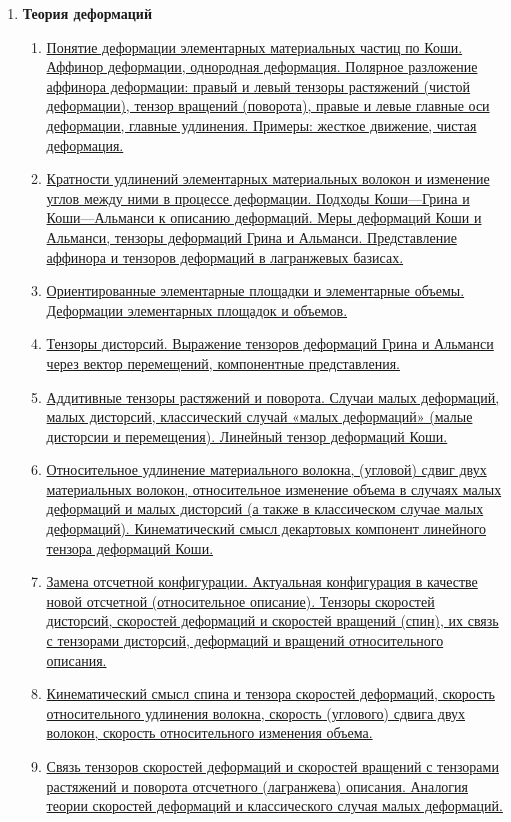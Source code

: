 \documentclass[a4paper,12pt]{article}
\begin{document}
\begin{enumerate}
\item \textbf{ Теория деформаций}
\begin{enumerate}
\item \hyperlink{bil3_1}{Понятие деформации элементарных материальных частиц по Коши. Аффинор деформации, однородная деформация. Полярное разложение аффинора деформации: правый и левый тензоры растяжений (чистой деформации), тензор вращений (поворота), правые и левые главные оси деформации, главные удлинения. Примеры: жесткое движение, чистая деформация.}
\item \hyperlink{bil3_2}{Кратности удлинений элементарных материальных волокон и изменение углов между ними в процессе деформации. Подходы Коши—Грина и Коши—Альманси к описанию деформаций. Меры деформаций Коши и Альманси, тензоры деформаций Грина и Альманси. Представление аффинора и тензоров деформаций в лагранжевых базисах.}
\item \hyperlink{bil3_3}{Ориентированные элементарные площадки и элементарные объемы. Деформации элементарных площадок и объемов.}
\item \hyperlink{bil3_4}{Тензоры дисторсий. Выражение тензоров деформаций Грина и Альманси через вектор перемещений, компонентные представления. }
\item \hyperlink{bil3_5}{Аддитивные тензоры растяжений и поворота. Случаи малых деформаций, малых дисторсий, классический случай «малых деформаций» (малые дисторсии и перемещения). Линейный тензор деформаций Коши. }
\item \hyperlink{bil3_6}{Относительное удлинение материального волокна, (угловой) сдвиг двух материальных волокон, относительное изменение объема в случаях малых деформаций и малых дисторсий (а также в классическом случае малых деформаций). Кинематический смысл декартовых компонент линейного тензора деформаций Коши.}
\item \hyperlink{bil3_7}{Замена отсчетной конфигурации. Актуальная конфигурация в качестве новой отсчетной (относительное описание). Тензоры скоростей дисторсий, скоростей деформаций и скоростей вращений (спин), их связь с тензорами дисторсий, деформаций и вращений относительного описания. }
\item \hyperlink{bil3_8}{Кинематический смысл спина и тензора скоростей деформаций, скорость относительного удлинения волокна, скорость (углового) сдвига двух волокон, скорость относительного изменения объема. }
\item \hyperlink{bil3_9}{ Связь тензоров скоростей деформаций и скоростей вращений с тензорами растяжений и поворота отсчетного (лагранжева) описания. Аналогия теории скоростей деформаций и классического случая малых деформаций. }


\end{enumerate}
\end{enumerate}
\end{document}
